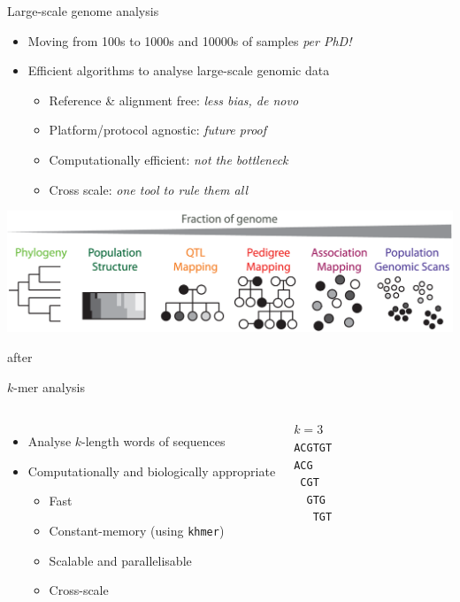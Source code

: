 \documentclass[t]{beamer}
\begin{document}
\begin{frame}{Large-scale genome analysis}
  \begin{itemize}
    \item Moving from 100s to 1000s and 10000s of samples \textit{per PhD!}
      \pause
    \item Efficient algorithms to analyse large-scale genomic data
    \begin{itemize}
      \item Reference \& alignment free: \textit{less bias, de novo}
      \item Platform/protocol agnostic: \textit{future proof}
      \item Computationally efficient: \textit{not the bottleneck}
      \item Cross scale: \textit{one tool to rule them all}
    \end{itemize}
  \end{itemize}
  \begin{center}
    \includegraphics[width=\textwidth]{img/cross-scale.png}
  \end{center}
  \tiny{after \textcite{peterson_double_2012}}
\end{frame}


\begin{frame}{$k$-mer analysis}
  \begin{columns}[t]
      \begin{itemize}
        \item<1-> Analyse $k$-length words of sequences
        \item<2> Computationally and biologically appropriate
        \begin{itemize}
          \item<2> Fast
          \item<2> Constant-memory (using \texttt{khmer})
          \item<2> Scalable and parallelisable
          \item<2> Cross-scale
        \end{itemize}
      \end{itemize}
      \vfill
    $k = 3$\\
    \texttt{ACGTGT}\\
    \texttt{ACG~~~}\\
    \texttt{~CGT~~}\\
    \texttt{~~GTG~}\\
    \texttt{~~~TGT}
  \end{columns}
\end{frame}
\end{document}

